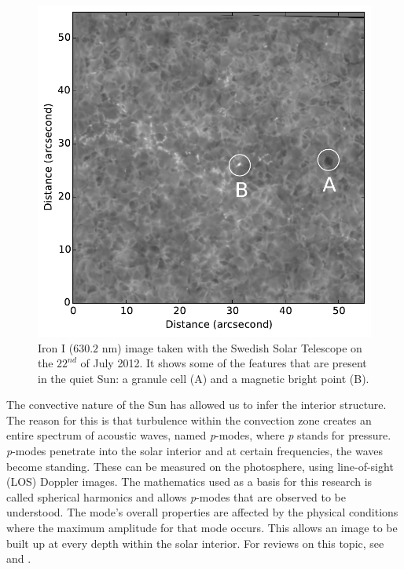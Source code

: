     \begin{figure}    
    	\centering
    	\includegraphics[width=\textwidth]{QS.pdf}
    	\caption{
    		Iron I ($630.2$ nm) image taken with the Swedish Solar Telescope on the $22^{{nd}}$ of July 2012.
    		It shows some of the features that are present in the quiet Sun: a granule cell (A) and a magnetic bright point (B).
    	}
    	\label{fig:photosphere}        
    \end{figure}   
       
    The convective nature of the Sun has allowed us to infer the interior structure. 
    The reason for this is that turbulence within the convection zone creates an entire spectrum of acoustic waves, named \textit{p}-modes, where \textit{p} stands for pressure.
    \textit{p}-modes penetrate into the solar interior and at certain frequencies, the waves become standing.
    These can be measured on the photosphere, using line-of-sight (LOS) Doppler images. 
    The mathematics used as a basis for this research is called spherical harmonics and allows \textit{p}-modes that are observed to be understood.
    The mode's overall properties are affected by the physical conditions where the maximum amplitude for that mode occurs. 
    This allows an image to be built up at every depth within the solar interior.
    For reviews on this topic, see \cite{annurev.aa.22.090184.003113} and \cite{RevModPhys.74.1073}.
    
